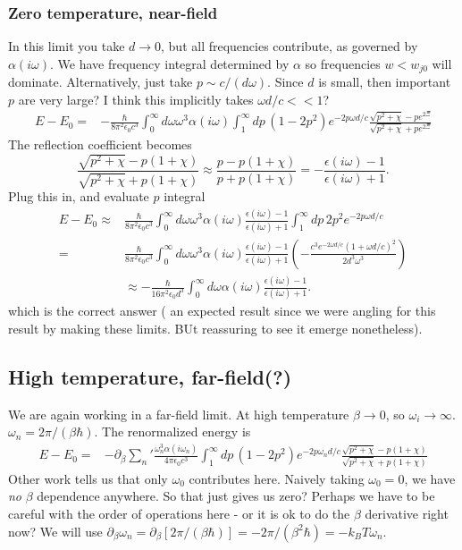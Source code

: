 \subsubsection{Zero temperature, near-field}

In this limit you take $d\rightarrow 0$, but all frequencies contribute, as governed by $\alpha(i\omega)$.
    We have frequency integral determined by $\alpha$ so frequencies $w < w_{j0}$ will dominate.
  Alternatively, just take $p\sim c/(d\omega)$.
  Since $d$ is small, then important $p$ are very large?
  I think this implicitly takes $\omega d/c<<1$?
\begin{align}
E-E_0=& -\frac{\hbar}{8\pi^2\epsilon_0c^3}\int_0^\infty d\omega \omega^3\alpha(i\omega)\int_1^\infty dp\,\left(1-2p^2\right)e^{-2p\omega d/c}\frac{\sqrt{p^2+\chi}-pe^{2\Xi}}{\sqrt{p^2+\chi}+p e^{2\Xi}} 
\end{align}
The reflection coefficient becomes
\begin{equation}
\frac{\sqrt{p^2+\chi}-p(1+\chi)}{\sqrt{p^2+\chi}+p(1+\chi)} \approx \frac{ p-p(1+\chi)}{p+p(1+\chi)} = -\frac{\epsilon(i\omega)-1}{\epsilon(i\omega)+1}.
\end{equation}
Plug this in, and evaluate $p$ integral
\begin{align}
E-E_0\approx& \frac{\hbar}{8\pi^2\epsilon_0c^3}\int_0^\infty d\omega \omega^3\alpha(i\omega)\frac{\epsilon(i\omega)-1}{\epsilon(i\omega)+1}\int_1^\infty dp\,2p^2e^{-2p\omega d/c}\\
=& \frac{\hbar}{8\pi^2\epsilon_0c^3}\int_0^\infty d\omega \omega^3\alpha(i\omega)\frac{\epsilon(i\omega)-1}{\epsilon(i\omega)+1}\left(-\frac{c^3e^{-2\omega d/c}(1+\omega d/c)^2}{2 d^3\omega^3}\right)\\
&\approx -\frac{\hbar }{16\pi^2\epsilon_0 d^3}\int_0^\infty d\omega \alpha(i\omega)\frac{\epsilon(i\omega)-1}{\epsilon(i\omega)+1}.
\end{align}
which is the correct answer ( an expected result since we were angling for this result by making these limits.  BUt reassuring to see it emerge nonetheless).  

\subsection{High temperature, far-field(?)}

We are again working in a far-field limit.  At high temperature $\beta\rightarrow 0$, so $\omega_i\rightarrow \infty$.  $\omega_n = 2\pi/(\beta\hbar)$.  
The renormalized energy is 
\begin{align}
E-E_0=& -\partial_\beta{\sum_n}'\frac{\omega^3_n\alpha(i\omega_n)}{4\pi\epsilon_0c^3}\int_1^\infty dp\,\left(1-2p^2\right)e^{-2p\omega_n d/c}\frac{\sqrt{p^2+\chi}-p(1+\chi)}{\sqrt{p^2+\chi}+p (1+\chi)} 
\end{align}
Other work tells us that only $\omega_0$ contributes here.  Naively taking $\omega_0=0$, we have \emph{no} $\beta$ dependence anywhere.  So that just gives us zero?  Perhaps we have to be careful with the order of operations here - or it is ok to do the $\beta$ derivative right now?  We will use $\partial_\beta\omega_n = \partial_\beta[2\pi/(\beta\hbar)] = -2\pi/(\beta^2\hbar) = -k_BT \omega_n$.

